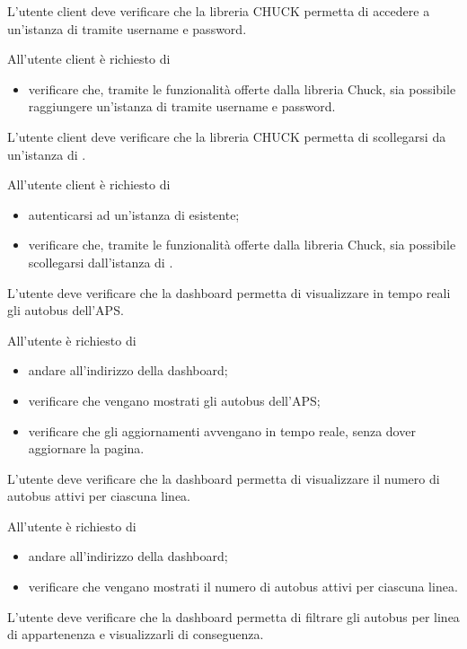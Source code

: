 	L'utente client deve verificare che la libreria CHUCK permetta di accedere a un'istanza di \projectname{} tramite username e password.
		
		All'utente client è richiesto di
		\begin{itemize}
			\item verificare che, tramite le funzionalità offerte dalla libreria Chuck, sia possibile raggiungere un'istanza di \projectname{} tramite username e password.
		\end{itemize}

	L'utente client deve verificare che la libreria CHUCK permetta di scollegarsi da un'istanza di \projectname{}.

		All'utente client è richiesto di
		\begin{itemize}
			\item autenticarsi ad un'istanza di \projectname{} esistente;
			\item verificare che, tramite le funzionalità offerte dalla libreria Chuck, sia possibile scollegarsi dall'istanza di \projectname{}.
		\end{itemize}

	L'utente deve verificare che la dashboard permetta di visualizzare in tempo reali gli autobus dell'APS.

		All'utente è richiesto di
		\begin{itemize}
			\item andare all'indirizzo della dashboard;
			\item verificare che vengano mostrati gli autobus dell'APS;
			\item verificare che gli aggiornamenti avvengano in tempo reale, senza dover aggiornare la pagina.
		\end{itemize}

	L'utente deve verificare che la dashboard permetta di visualizzare il numero di autobus attivi per ciascuna linea.

		All'utente è richiesto di
		\begin{itemize}
			\item andare all'indirizzo della dashboard;
			\item verificare che vengano mostrati il numero di autobus attivi per ciascuna linea.
		\end{itemize}

	L'utente deve verificare che la dashboard permetta di filtrare gli autobus per linea di appartenenza e visualizzarli di conseguenza.

